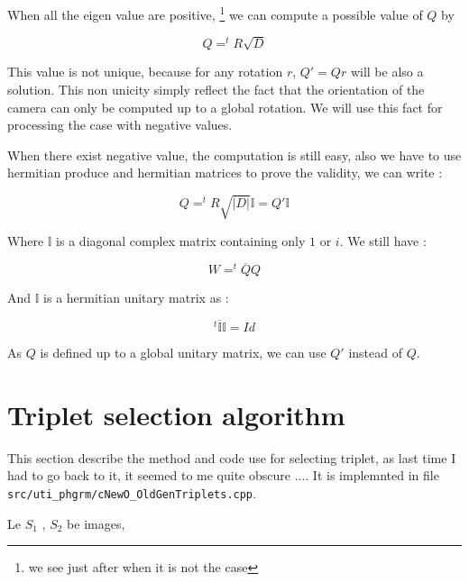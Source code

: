 When all the eigen value are positive, 
\footnote{we see just after when it is not the case}
we can compute a possible value of $Q$ by 

\begin{equation}
    Q  =  ^t R  \sqrt{D}
\end{equation}

This value is not unique, because for any rotation $r$, $Q' = Qr$ will be also a solution. This
non unicity simply reflect the fact that the orientation of the camera can only be computed
up to a global rotation. We will use this fact for processing the case with negative values.

When there exist negative value, the computation is still easy, also we have to use hermitian produce
and hermitian matrices to prove the validity, we can write : 

\begin{equation}
    Q  =  ^t R  \sqrt{|D|} \mathbb{I} = Q' \mathbb{I} 
\end{equation}

Where $\mathbb{I}$  is a diagonal complex matrix containing only $1$ or $i$. We still have :

\begin{equation}
    W= ^t \overline{Q}  Q
\end{equation}

And $\mathbb{I}$ is a hermitian unitary matrix as : 

\begin{equation}
     ^t  \overline{\mathbb{I}}  \mathbb{I} = Id
\end{equation}


As $Q$ is defined up to a global unitary matrix, we can use $Q'$ instead of $Q$.


\section{Triplet selection algorithm}

This section describe the method and code use for selecting triplet, 
as last time I had to go back to it, it seemed to me quite obscure ....
It is implemnted in file {\tt src/uti\_phgrm/cNewO\_OldGenTriplets.cpp}.

Le $S_1$ , $S_2$ be images,


